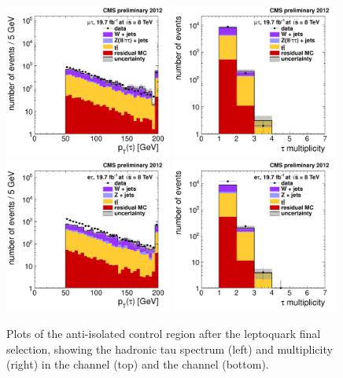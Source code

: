 \begin{figure}[hbtp]
  \begin{center}
    \includegraphics[width=0.49\textwidth]{figures/bkgEstim/pttauantiisoall_mutau.pdf}
    \includegraphics[width=0.49\textwidth]{figures/bkgEstim/ntauantiiso_mutau.pdf} \\
    \includegraphics[width=0.49\textwidth]{figures/bkgEstim/pttauantiisoall_etau.pdf}
    \includegraphics[width=0.49\textwidth]{figures/bkgEstim/ntauantiiso_etau.pdf} 
    \caption{Plots of the anti-isolated control region after the leptoquark final selection, showing the hadronic tau \pt spectrum (left) and multiplicity (right) in the \mutau channel (top) and the \etau channel (bottom). \label{Bkg:fig:antiiso}}
  \end{center}
\end{figure}

